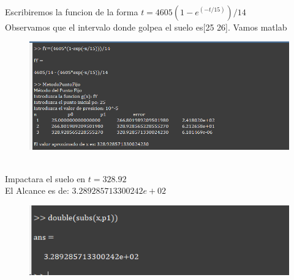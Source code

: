\documentclass{article}
\theoremstyle{mytheoremstyle}
\theoremstyle{mytheoremstyle}
\theoremstyle{myproblemstyle}
\begin{document}
\\Escribiremos la funcion de la forma $t=4605(1-e^(-t/15))/14$ 
\\Observamos que el intervalo donde golpea el suelo es[25 26]. Vamos matlab
 \begin{figure}[ht]
    \includegraphics[scale=0.6]{img/eje2_4.png}
\end{figure}
\\Impactara el suelo en $t=328.92$
\\El Alcance es de: $3.289285713300242e+02$
\begin{figure}[ht]
    \includegraphics[scale=0.6]{img/eje2_5.png}
\end{figure}
\end{document}
